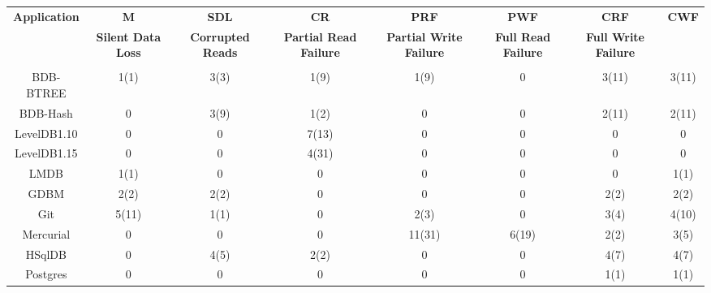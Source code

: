\begin{table}[!t]
\begin{center}
\setlength{\tmpa}{\tabcolsep}
\setlength{\tabcolsep}{2pt}
{\footnotesize
\begin{tabular}{c|c|c|c|c|c|c|c}
\textbf{Application} & 
\textbf{M} & 
\textbf{SDL} & 
\textbf{CR} & 
\textbf{PRF} & 
\textbf{PWF} & 
\textbf{CRF} & 
\textbf{CWF} \\ 
\if 0
\multirow{2}{9mm}{\centering \textbf{Misc}} & 
\multirow{2}{14mm}{\centering \textbf{Silent Data Loss}} &
\multirow{2}{13mm}{\centering \textbf{Corrupted Reads}} &
\multirow{2}{10mm}{\centering \textbf{Partial Read Failure}} &
\multirow{2}{10mm}{\centering \textbf{Partial Write Failure}} & 
\multirow{2}{12mm}{\centering \textbf{Full Read Failure}} &
\multirow{2}{13mm}{\centering \textbf{Full Write Failure}} \\
& & & & & & & \\
& & & & & & & \\
\fi
\hline
BDB-BTREE & 1(1) & 3(3) & 1(9) & 1(9) &  0  & 3(11) & 3(11) \\ \hline 
BDB-Hash &  0  & 3(9) & 1(2) &  0  &  0  & 2(11) & 2(11) \\ \hline 
LevelDB1.10 &  0  &  0  & 7(13) &  0  &  0  &  0  &  0  \\ \hline 
LevelDB1.15 &  0  &  0  & 4(31) &  0  &  0  &  0  &  0  \\ \hline 
LMDB & 1(1) &  0  &  0  &  0  &  0  &  0  & 1(1) \\ \hline 
GDBM & 2(2) & 2(2) &  0  &  0  &  0  & 2(2) & 2(2) \\ \hline 
Git & 5(11) & 1(1) &  0  & 2(3) &  0  & 3(4) & 4(10) \\ \hline 
Mercurial &  0  &  0  &  0  & 11(31) & 6(19) & 2(2) & 3(5) \\ \hline 
HSqlDB &  0  & 4(5) & 2(2) &  0  &  0  & 4(7) & 4(7) \\ \hline 
Postgres &  0  &  0  &  0  &  0  &  0  & 1(1) & 1(1) \\ 

\end{tabular}
}
\end{center}
\vspace{-0.2in}
\vspace{-0.2in}
\setlength{\tabcolsep}{\tmpa}
\end{table}
